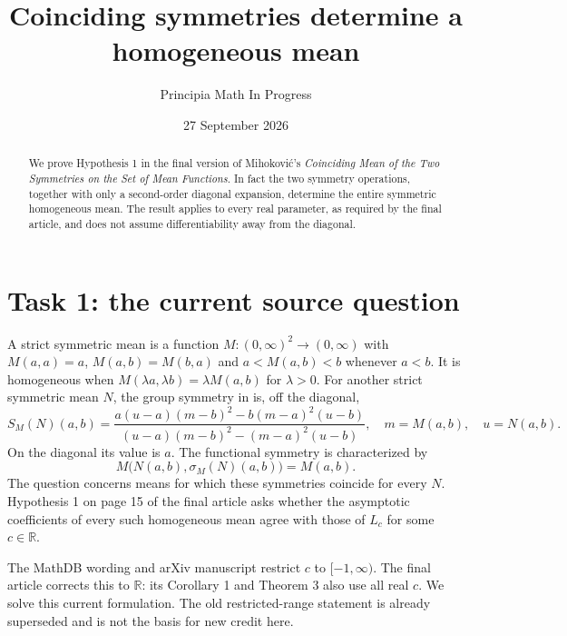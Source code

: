 \documentclass[11pt]{article}
\title{Coinciding symmetries determine a homogeneous mean}
\author{Principia Math In Progress}
\date{27 September 2026}
\newcommand{\RR}{\mathbb R}
\begin{document}
\maketitle
\begin{abstract}
We prove Hypothesis 1 in the final version of Mihokovi\'c's
\emph{Coinciding Mean of the Two Symmetries on the Set of Mean Functions}.
In fact the two symmetry operations, together with only a second-order
diagonal expansion, determine the entire symmetric homogeneous mean.
The result applies to every real parameter, as required by the final
article, and does not assume differentiability away from the diagonal.
\end{abstract}

\section*{Task 1: the current source question}
A strict symmetric mean is a function $M:(0,\infty)^2\to(0,\infty)$
with $M(a,a)=a$, $M(a,b)=M(b,a)$ and
$a<M(a,b)<b$ whenever $a<b$. It is homogeneous when
$M(\lambda a,\lambda b)=\lambda M(a,b)$ for $\lambda>0$.
For another strict symmetric mean $N$, the group symmetry in
\cite[Definition 1 and (4)]{M} is, off the diagonal,
\begin{equation}\label{S}
 S_M(N)(a,b)=
 \frac{a(u-a)(m-b)^2-b(m-a)^2(u-b)}
 {(u-a)(m-b)^2-(m-a)^2(u-b)},\quad
 m=M(a,b),\quad u=N(a,b).
\end{equation}
On the diagonal its value is $a$.
The functional symmetry is characterized by
\begin{equation}\label{F}
 M\bigl(N(a,b),\sigma_M(N)(a,b)\bigr)=M(a,b).
\end{equation}
The question concerns means for which these symmetries coincide for
every $N$. Hypothesis 1 on page 15 of the final article asks whether
the asymptotic coefficients of every such homogeneous mean agree
with those of $L_c$ for some $c\in\RR$.

The MathDB wording and arXiv manuscript restrict $c$ to $[-1,\infty)$.
The final article corrects this to $\RR$: its Corollary 1 and Theorem 3
also use all real $c$. We solve this current formulation. The old
restricted-range statement is already superseded and is not the basis
for new credit here.
\end{document}
